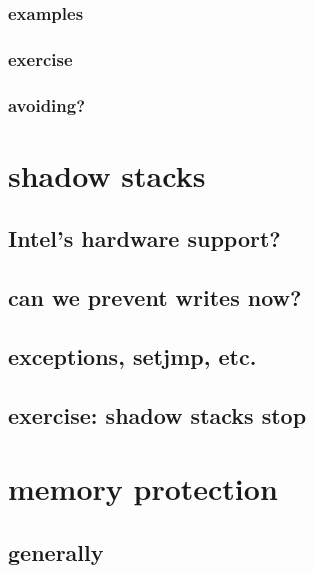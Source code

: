 \subsubsection{examples}


\subsubsection{exercise}


\subsubsection{avoiding?}


\section{shadow stacks}


\subsection{Intel's hardware support?}


\subsection{can we prevent writes now?}


\subsection{exceptions, setjmp, etc.}


\subsection{exercise: shadow stacks stop}


\section{memory protection}
\subsection{generally}


